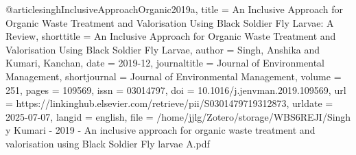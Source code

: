 {{{{@article{singhInclusiveApproachOrganic2019a,
  title = {An Inclusive Approach for Organic Waste Treatment and Valorisation Using {{Black Soldier Fly}} Larvae: {{A}} Review},
  shorttitle = {An Inclusive Approach for Organic Waste Treatment and Valorisation Using {{Black Soldier Fly}} Larvae},
  author = {Singh, Anshika and Kumari, Kanchan},
  date = {2019-12},
  journaltitle = {Journal of Environmental Management},
  shortjournal = {Journal of Environmental Management},
  volume = {251},
  pages = {109569},
  issn = {03014797},
  doi = {10.1016/j.jenvman.2019.109569},
  url = {https://linkinghub.elsevier.com/retrieve/pii/S0301479719312873},
  urldate = {2025-07-07},
  langid = {english},
  file = {/home/jjlg/Zotero/storage/WBS6REJI/Singh y Kumari - 2019 - An inclusive approach for organic waste treatment and valorisation using Black Soldier Fly larvae A.pdf}
}

}}}}
